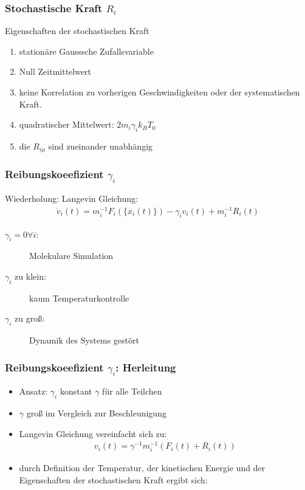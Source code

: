 \documentclass{beamer}
\begin{document}
\begin{frame}
  \frametitle{Stochastische Kraft $R_i$}
  \begin{block}{Eigenschaften der stochastischen Kraft} 
  	\begin{enumerate}
  		\item stationäre Gausssche Zufallsvariable
  		\item Null Zeitmittelwert %
  		\item keine Korrelation zu vorherigen Geschwindigkeiten oder der systematischen Kraft. 
  		\item quadratischer Mittelwert: $2 m_i \gamma_i k_B T_0$
  		\item die $R_{i \mu}$ sind zueinander unabhängig
  	\end{enumerate}
  \end{block}	
  
  
\end{frame}


\begin{frame}
	\frametitle{Reibungskoeefizient $\gamma_i$}
	Wiederholung: Langevin Gleichung:
	\begin{align*}
		\dot{v}_i(t)  = m_i^{-1} F_i(\{x_i(t)\}) - \gamma_i v_i(t) + m_i^{-1} R_i(t)
	\end{align*}
	\hspace{2em}
	
	\begin{description}
		\item[$\gamma_i=0 \forall i$:] Molekulare Simulation
		\item[$\gamma_i$ zu klein:] kaum Temperaturkontrolle
		\item[$\gamma_i$ zu groß:] Dynamik des Systems gestört 
	\end{description}
\end{frame}


\begin{frame}
	\frametitle{Reibungskoeefizient $\gamma_i$: Herleitung}
	\begin{itemize}
	    \item Ansatz: $\gamma_i$ konstant $\gamma$ für alle Teilchen
	    \item $\gamma$ groß im Vergleich zur Beschleunigung
	    \item Langevin Gleichung vereinfacht sich zu:
	    \begin{align*}
	    v_i(t) = \gamma^{-1} m_i^{-1} (F_i(t) + R_i(t) )
	    \end{align*}
	    \item durch Definition der Temperatur, der kinetischen Energie und der Eigenschaften der stochastischen Kraft ergibt sich: 
	     
	\end{itemize}
    	
\end{frame}
\end{document}
